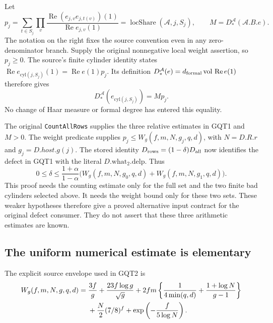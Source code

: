\documentclass[11pt,a4paper]{article}
\numberwithin{equation}{section}
\theoremstyle{remark}\newtheorem{remark}[theorem]{Remark}
\begin{document}
Let
\[
 p_j=\sum_{t\in S_j}\prod_v
   \frac{\operatorname{Re}(e_{j,\allowbreak{} v}e_{j,\allowbreak{} t(v)})(1)}
        {\operatorname{Re}e_{j,\allowbreak{} v}(1)}
       =\operatorname{locShare}(\mathcal A,\allowbreak{} j,\allowbreak{} S_j),
 \qquad M=D_*^{\mathcal A}(\mathcal A.B.e).
\]
The notation on the right fixes the source convention even in any
zero-denominator branch. Supply the original nonnegative local
weight assertion, so $p_j\ge0$. The source's finite cylinder
identity states
$\operatorname{Re}e_{\mathrm{cyl}(j,\allowbreak{} S_j)}(1)
=\operatorname{Re}e(1)p_j$. Its definition
$D_*^{\mathcal A}(e)=d_{\rm formal}\operatorname{vol}\,
\operatorname{Re}e(1)$ therefore gives
\[
       D_*^{\mathcal A}(e_{\mathrm{cyl}(j,\allowbreak{} S_j)})=Mp_j.
\]
No change of Haar measure or formal degree has entered this equality.

The original \texttt{Count\allowbreak All\allowbreak Rows} supplies the three relative
estimates in GQT1 and $M>0$. The weight predicate supplies
$p_j\le W_g(f,\allowbreak{} m,\allowbreak{} N,\allowbreak{} g_j,\allowbreak{} q,\allowbreak{} d)$, with $N=D.R.r$ and $g_j=D.host.g(j)$.
The stored identity $D_{\rm rows}=(1-\delta)D_{\rm all}$ now
identifies the defect in GQT1 with the literal $D.\mathrm{what}_2.
\mathrm{delp}$. Thus
\begin{equation}\label{eq:gqt-source-share}
 0\le\delta\le\frac{1+\alpha}{1-\alpha}
       \bigl(W_g(f,\allowbreak{} m,\allowbreak{} N,\allowbreak{} g_0,\allowbreak{} q,\allowbreak{} d)+W_g(f,\allowbreak{} m,\allowbreak{} N,\allowbreak{} g_1,\allowbreak{} q,\allowbreak{} d)\bigr).
\end{equation}
This proof needs the counting estimate only for the full set and the
two finite bad cylinders selected above. It needs the weight bound
only for these two sets. These weaker hypotheses therefore give a
proved alternative input contract for the original defect consumer.
They do not assert that these three arithmetic estimates are known.

\subsection{The uniform numerical estimate is elementary}

The explicit source envelope used in GQT2 is
\begin{align}
 W_g(f,\allowbreak{} m,\allowbreak{} N,\allowbreak{} g,\allowbreak{} q,\allowbreak{} d)={}&\frac{3f}{g}
       +\frac{23f\log g}{\sqrt g}
       +2fm\left\{\frac1{4\min(q,\allowbreak{} d)}
                         +\frac{1+\log N}{g-1}\right\}\notag\\
       &+\frac N2(7/8)^f
         +\exp\left(-\frac f{5\log N}\right).           \label{eq:gqt-W}
\end{align}
\end{document}
